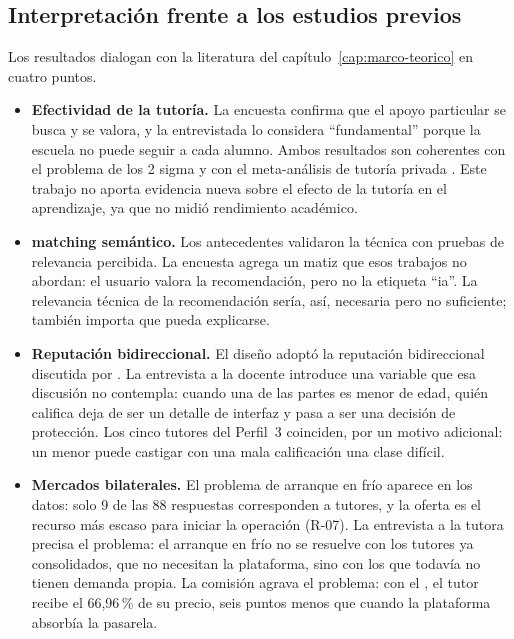 \subsection{Interpretación frente a los estudios previos}

Los resultados dialogan con la literatura del
capítulo~\ref{cap:marco-teorico} en cuatro puntos.

\begin{itemize}
    \item \textbf{Efectividad de la tutoría.} La encuesta confirma que el
          apoyo particular se busca y se valora, y la entrevistada lo
          considera ``fundamental'' porque la escuela no puede seguir a
          cada alumno. Ambos resultados son coherentes con
          el problema de los 2 sigma \citep{bloom1984} y con el
          meta-análisis de tutoría privada \citep{sciencedirect2022}. Este
          trabajo no aporta evidencia nueva sobre el efecto de la tutoría
          en el aprendizaje, ya que no midió rendimiento académico.
    \item \textbf{\Gls{matching} semántico.} Los antecedentes
          \citep{isotropy2026, paperrec2025} validaron la técnica con
          pruebas de relevancia percibida. La encuesta agrega un matiz que
          esos trabajos no abordan: el usuario valora la recomendación,
          pero no la etiqueta ``\gls{ia}''. La relevancia técnica de la
          recomendación sería, así, necesaria pero no suficiente; también
          importa que pueda explicarse.
    \item \textbf{Reputación bidireccional.} El diseño adoptó la
          reputación bidireccional discutida por \citet{reputation}. La
          entrevista a la docente introduce una variable que esa discusión no
          contempla: cuando una de las partes es menor de edad, quién
          califica deja de ser un detalle de interfaz y pasa a ser una
          decisión de protección. Los cinco tutores del Perfil~3
          coinciden, por un motivo adicional: un menor puede castigar con
          una mala calificación una clase difícil.
    \item \textbf{Mercados bilaterales.} El problema de arranque en frío
          \citep{rochet2006} aparece en los datos: solo 9 de las 88
          respuestas corresponden a tutores, y la oferta es el recurso más
          escaso para iniciar la operación (R-07). La entrevista a la tutora
          precisa el problema: el arranque en frío no se resuelve con los
          tutores ya consolidados, que no necesitan la plataforma, sino con
          los que todavía no tienen demanda propia. La comisión agrava el
          problema: con el \comision{}, el tutor recibe el 66,96\,\% de su
          precio, seis puntos menos que cuando la plataforma absorbía la
          pasarela.
\end{itemize}

